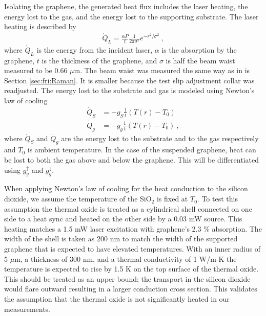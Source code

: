 Isolating the graphene, the generated heat flux includes the laser heating, the energy lost to the gas, and the energy lost to the supporting substrate.
The laser heating is described by
\begin{align}
	\dot{Q}_{L}=\frac{\alpha P}{t} \frac{1}{2 \pi \sigma^2} e^{-r^2/\sigma^2} \ ,
\end{align}
where $\dot{Q}_L$ is the energy from the incident laser, $\alpha$ is the absorption by the graphene, $t$ is the thickness of the graphene, and $\sigma$ is half the beam waist measured to be 0.66 $\mu$m.
The beam waist was measured the same way as in is Section \ref{sec:fri:Raman}.
It is smaller because the test slip adjustment collar was readjusted.
The energy lost to the substrate and gas is modeled using Newton's law of cooling
\begin{align*}
	\dot{Q}_{S}&=-g_S \frac{1}{t} \left(T(r)-T_0 \right) \\
	\dot{Q}_{g}&=-g_g \frac{1}{t} \left(T(r)-T_0 \right) \ ,
\end{align*}
where $\dot{Q}_{S}$ and $\dot{Q}_g$ are the energy lost to the substrate and to the gas respectively and $T_0$ is ambient temperature.
In the case of the suspended graphene, heat can be lost to both the gas above and below the graphene.
This will be differentiated using $g_g^{\uparrow}$ and $g_g^{\downarrow}$.

When applying Newton's law of cooling for the heat conduction to the silicon dioxide, we assume the temperature of the SiO$_2$ is fixed at $T_0$.
To test this assumption the thermal oxide is treated as a cylindrical shell connected on one side to a heat sync and heated on the other side by a 0.03 mW source.
This heating matches a 1.5 mW laser excitation with graphene's 2.3 \% absorption.
The width of the shell is taken as 200 nm to match the width of the supported graphene that is expected to have elevated temperatures.
With an inner radius of 5 $\mu$m, a thickness of 300 nm, and a thermal conductivity of 1 W/m-K \cite{Resnick2002} the temperature is expected to rise by 1.5 K on the top surface of the thermal oxide.
This should be treated as an upper bound; the transport in the silicon dioxide would flare outward resulting in a larger conduction cross section.
This validates the assumption that the thermal oxide is not significantly heated in our measurements.

